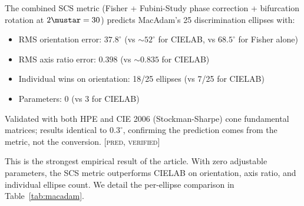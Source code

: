 \documentclass[12pt,a4paper]{article}
\begin{document}
\begin{predictionbox}
The combined SCS metric (Fisher + Fubini-Study phase correction +
bifurcation rotation at $2\mustar = 30$) predicts MacAdam's 25
discrimination ellipses with:
\begin{itemize}[nosep]
\item RMS orientation error: $37.8^\circ$ (vs $\sim\!52^\circ$ for
  CIELAB, vs $68.5^\circ$ for Fisher alone)
\item RMS axis ratio error: $0.398$ (vs $\sim\!0.835$ for CIELAB)
\item Individual wins on orientation: 18/25 ellipses (vs 7/25 for CIELAB)
\item Parameters: 0 (vs 3 for CIELAB)
\end{itemize}
Validated with both HPE and CIE 2006 (Stockman-Sharpe) cone fundamental
matrices; results identical to $0.3^\circ$, confirming the prediction
comes from the metric, not the conversion. \textsc{[pred, verified]}
\end{predictionbox}

This is the strongest empirical result of the article. With zero
adjustable parameters, the SCS metric outperforms CIELAB on
orientation, axis ratio, and individual ellipse count. We detail
the per-ellipse comparison in Table~\ref{tab:macadam}.
\end{document}
